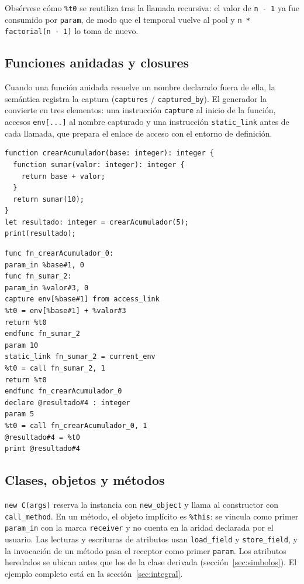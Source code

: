 \documentclass[11pt,a4paper]{article}
\begin{document}
Obsérvese cómo \texttt{\%t0} se reutiliza tras la llamada recursiva: el valor de
\texttt{n - 1} ya fue consumido por \texttt{param}, de modo que el temporal
vuelve al pool y \texttt{n * factorial(n - 1)} lo toma de nuevo.

\subsection{Funciones anidadas y closures}

Cuando una función anidada resuelve un nombre declarado fuera de ella, la
semántica registra la captura (\texttt{captures} / \texttt{captured\_by}). El
generador la convierte en tres elementos: una instrucción \texttt{capture} al
inicio de la función, accesos \texttt{env[...]} al nombre capturado y una
instrucción \texttt{static\_link} antes de cada llamada, que prepara el enlace de
acceso con el entorno de definición.

\noindent
\begin{minipage}[t]{0.50\textwidth}
\begin{lstlisting}[language=Compiscript,style=sinnumero,basicstyle=\ttfamily\scriptsize]
function crearAcumulador(base: integer): integer {
  function sumar(valor: integer): integer {
    return base + valor;
  }
  return sumar(10);
}
let resultado: integer = crearAcumulador(5);
print(resultado);
\end{lstlisting}
\end{minipage}\hfill
\begin{minipage}[t]{0.47\textwidth}
\begin{lstlisting}[language=TAC,style=sinnumero,basicstyle=\ttfamily\scriptsize]
func fn_crearAcumulador_0:
param_in %base#1, 0
func fn_sumar_2:
param_in %valor#3, 0
capture env[%base#1] from access_link
%t0 = env[%base#1] + %valor#3
return %t0
endfunc fn_sumar_2
param 10
static_link fn_sumar_2 = current_env
%t0 = call fn_sumar_2, 1
return %t0
endfunc fn_crearAcumulador_0
declare @resultado#4 : integer
param 5
%t0 = call fn_crearAcumulador_0, 1
@resultado#4 = %t0
print @resultado#4
\end{lstlisting}
\end{minipage}

\subsection{Clases, objetos y métodos}

\texttt{new C(args)} reserva la instancia con \texttt{new\_object} y llama al
constructor con \texttt{call\_method}. En un método, el objeto implícito es
\texttt{\%this}: se vincula como primer \texttt{param\_in} con la marca
\texttt{receiver} y no cuenta en la aridad declarada por el usuario. Las
lecturas y escrituras de atributos usan \texttt{load\_field} y
\texttt{store\_field}, y la invocación de un método pasa el receptor como primer
\texttt{param}. Los atributos heredados se ubican antes que los de la clase
derivada (sección~\ref{sec:simbolos}). El ejemplo completo está en la
sección~\ref{sec:integral}.
\end{document}
